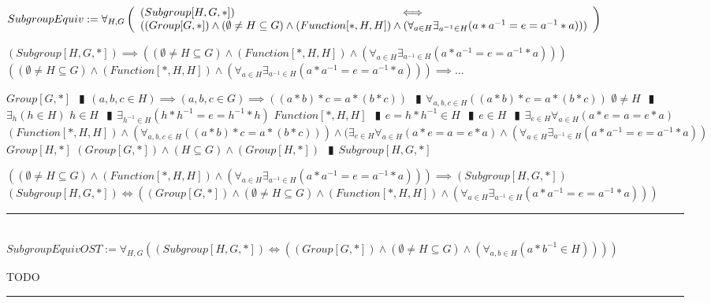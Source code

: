 \documentclass{book}
\newcommand{\abr}{:=}
\newcommand{\pipe}{$\phantom{(}\vrectangleblack\phantom{)}$}
\begin{document}
$SubgroupEquiv \abr \forall_{H, G}\left(\begin{array}{ll}
  (Subgroup[H, G, *]) \hfill \iff \hfill \\
  ((Group[G, *]) \land (\emptyset \neq H \subseteq G) \land (Function[*, H, H]) \land (\forall_{a \in H} \exists_{a^{-1} \in H}(a * a^{-1} = e = a^{-1} * a)))
\end{array}\right)$
\begin{enumerate}
  \lit $(Subgroup[H, G, *]) \implies ((\emptyset \neq H \subseteq G) \land (Function[*, H, H]) \land (\forall_{a \in H} \exists_{a^{-1} \in H}(a * a^{-1} = e = a^{-1} * a)))$
  \lit $((\emptyset \neq H \subseteq G) \land (Function[*, H, H]) \land (\forall_{a \in H} \exists_{a^{-1} \in H}(a * a^{-1} = e = a^{-1} * a))) \implies \ldots$
  \begin{enumerate}
    \lit $Group[G, *]$ \pipe $(a, b, c \in H) \implies (a, b, c \in G) \implies ((a * b) * c = a * (b * c))$ \pipe $\forall_{a, b, c \in H}((a * b) * c = a * (b * c))$
    \lit $\emptyset \neq H$ \pipe $\exists_{h}(h \in H)$
    \lit $h \in H$ \pipe $\exists_{h^{-1} \in H}(h * h^{-1} = e = h^{-1} * h)$
    \lit $Function[*, H, H]$ \pipe $e = h * h^{-1} \in H$ \pipe $e \in H$ \pipe $\exists_{e \in H} \forall_{a \in H}(a * e = a = e * a)$
    \lit $(Function[*, H, H]) \land (\forall_{a, b, c \in H}((a * b) * c = a * (b * c))) \land (\exists_{e \in H} \forall_{a \in H}(a * e = a = e * a) \land (\forall_{a \in H} \exists_{a^{-1} \in H}(a * a^{-1} = e = a^{-1} * a))$
    \lit $Group[H, *]$
    \lit $(Group[G, *]) \land (H \subseteq G) \land (Group[H, *])$ \pipe $Subgroup[H, G, *]$
  \end{enumerate}
  \lit $((\emptyset \neq H \subseteq G) \land (Function[*, H, H]) \land (\forall_{a \in H} \exists_{a^{-1} \in H}(a * a^{-1} = e = a^{-1} * a))) \implies (Subgroup[H, G, *])$
  \lit $(Subgroup[H, G, *]) \iff ((Group[G, *]) \land (\emptyset \neq H \subseteq G) \land (Function[*, H, H]) \land (\forall_{a \in H} \exists_{a^{-1} \in H}(a * a^{-1} = e = a^{-1} * a)))$
\end{enumerate} \vspace{.75mm} \hrule \vspace{.75mm} \ \\

$SubgroupEquivOST \abr \forall_{H, G}((Subgroup[H, G, *]) \iff ((Group[G, *]) \land (\emptyset \neq H \subseteq G) \land (\forall_{a, b \in H}(a * b^{-1} \in H))))$
\begin{enumerate}
  \lit TODO
\end{enumerate} \vspace{.75mm} \hrule \vspace{.75mm} \ \\
\end{document}
